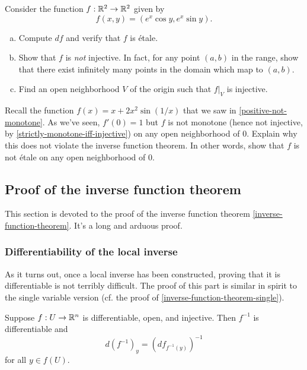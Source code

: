 \begin{exercise} \label{locally-injective-not-injective}
	Consider the function $f : \mathbb{R}^2 \to \mathbb{R}^2$ given by 
	\[ f(x,y) = (e^x \cos y, e^x \sin y). \]
	\begin{enumerate}[(a)]
		\item Compute $df$ and verify that $f$ is \'etale. 
		\item Show that $f$ is \emph{not} injective. In fact, for any point $(a,b)$ in the range, show that there exist infinitely many points in the domain which map to $(a,b)$.
		\item Find an open neighborhood $V$ of the origin such that $f|_V$ is injective. 
	\end{enumerate}
\end{exercise}

\begin{exercise}
	Recall the function $f(x) = x + 2x^2 \sin(1/x)$ that we saw in \cref{positive-not-monotone}. As we've seen, $f'(0) = 1$ but $f$ is not monotone (hence not injective, by \cref{strictly-monotone-iff-injective}) on any open neighborhood of $0$. Explain why this does not violate the inverse function theorem. In other words, show that $f$ is not \'etale on any open neighborhood of 0.
\end{exercise}

\subsection{Proof of the inverse function theorem \starred}

This section is devoted to the proof of the inverse function theorem \ref{inverse-function-theorem}. It's a long and arduous proof.

\subsubsection*{Differentiability of the local inverse}

As it turns out, once a local inverse has been constructed, proving that it is differentiable is not terribly difficult. The proof of this part is similar in spirit to the single variable version (cf. the proof of \cref{inverse-function-theorem-single}).

\begin{proposition} \label{inverse-differentiable}
	Suppose $f : U \to \mathbb{R}^n$ is differentiable, open, and injective. Then $f^{-1}$ is differentiable and \[ d(f^{-1})_y = (df_{f^{-1}(y)})^{-1} \] for all $y \in f(U)$. 
\end{proposition}

